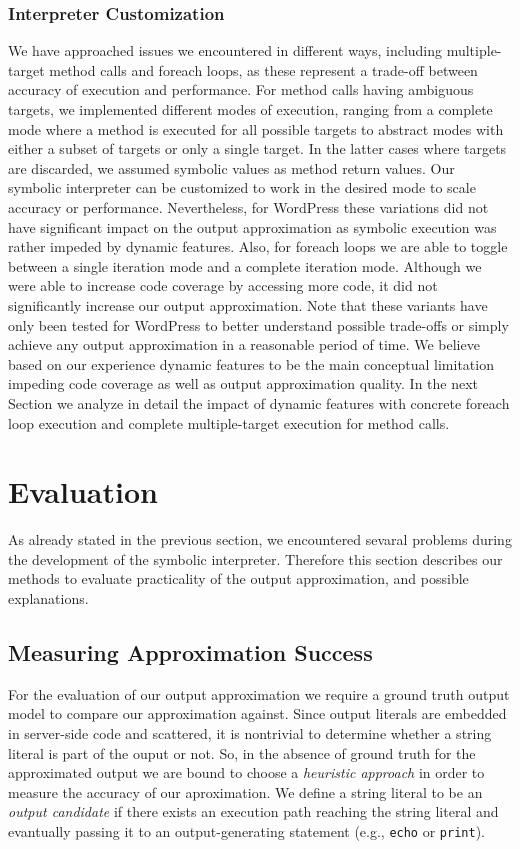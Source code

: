 \documentclass[sigconf]{acmart}
\renewcommand{\sf}[1]{\textsf{#1}}
\begin{document}
\subsubsection{Interpreter Customization}
We have approached issues we encountered in different ways, including
multiple-target method calls and foreach loops, as these represent a trade-off
between accuracy of execution and performance.
For method calls having ambiguous targets, we implemented different modes of
execution, ranging from a complete mode where a method is executed for all
possible targets to abstract modes with either a subset of targets or only a
single target. In the latter cases where targets are discarded, we assumed
symbolic values as method return values. Our symbolic interpreter can be
customized to work in the desired mode to scale accuracy or performance.
Nevertheless, for \sf{WordPress} these variations did not have significant
impact on the output approximation as symbolic execution was rather impeded by
dynamic features.
Also, for foreach loops we are able to toggle between a single iteration mode
and a complete iteration mode. Although we were able to increase code coverage
by accessing more code, it did not significantly increase our output
approximation.
Note that these variants have only been tested for \sf{WordPress} to better
understand possible trade-offs or simply achieve any output approximation in a
reasonable period of time. We believe based on our experience dynamic features
to be the main conceptual limitation impeding code coverage as well as output
approximation quality. In the next Section we analyze in detail the impact of
dynamic features with concrete foreach loop execution and complete
multiple-target execution for method calls.


\section{Evaluation}
As already stated in the previous section, we encountered sevaral problems
during the development of the symbolic interpreter. Therefore this section
describes our methods to evaluate practicality of the output approximation, and
possible explanations.

\subsection{Measuring Approximation Success} \label{heuristic}
For the evaluation of our output approximation we require a ground truth output
model to compare our approximation against. Since output literals are embedded
in server-side code and scattered, it is nontrivial to determine whether a
string literal is part of the ouput or not. So, in the absence of ground truth
for the approximated output we are bound to choose a \emph{heuristic approach}
in order to measure the accuracy of our aproximation. We define a string
literal to be an \emph{output candidate} if there exists an execution path
reaching the string literal and evantually passing it to an output-generating
statement (e.g., \texttt{echo} or \texttt{print}).
\end{document}
